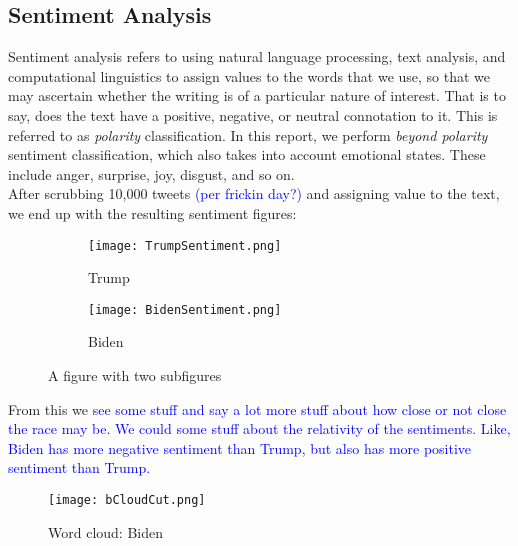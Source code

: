 \documentclass[11pt, oneside]{article}
\begin{document}
\subsection{Sentiment Analysis}
Sentiment analysis refers to using natural language processing, text analysis, and computational linguistics to assign values to the words that we use, so that we may ascertain whether the writing is of a particular nature of interest. That is to say, does the text have a positive, negative, or neutral connotation to it. This is referred to as \emph{polarity} classification. In this report, we perform \emph{beyond polarity} sentiment classification, which also takes into account emotional states. These include anger, surprise, joy, disgust, and so on. \\

After scrubbing 10,000 tweets \textcolor{blue}{(per frickin day?)} and assigning value to the text, we end up with the resulting sentiment figures:\\

\begin{figure}[H]
\centering
\begin{subfigure}{.5\textwidth}
  \centering
  \texttt{[image: TrumpSentiment.png]}
  \caption{Trump}
  \label{Trump}
\end{subfigure}%
\begin{subfigure}{.5\textwidth}
  \centering
  \texttt{[image: BidenSentiment.png]}
  \caption{Biden}
  \label{Biden}
\end{subfigure}
\caption{A figure with two subfigures}
\label{fig:test}
\end{figure}

From this we \textcolor{blue}{see some stuff and say a lot more stuff about how close or not close the race may be. We could some stuff about the relativity of the sentiments. Like, Biden has more negative sentiment than Trump, but also has more positive sentiment than Trump.}


\begin{wrapfigure}[]{R}{0.3\textwidth}
\vspace{-0.55cm}
\texttt{[image: bCloudCut.png]}
\caption{\small{Word cloud: Biden}}
\vspace{-.55cm}
\end{wrapfigure}
\end{document}
